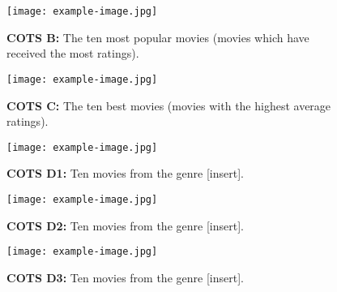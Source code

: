 \begin{figure}[!h]
    \centering
    \texttt{[image: example-image.jpg]}
    \caption{\textbf{COTS B:} The ten most popular movies (movies which have received the most ratings).}
    \label{fig:cots-vis-b}
\end{figure}

\begin{figure}[!h]
    \centering
    \texttt{[image: example-image.jpg]}
    \caption{\textbf{COTS C:} The ten best movies (movies with the highest average ratings).}
    \label{fig:cots-vis-c}
\end{figure}

\begin{figure}[!h]
    \centering
    \texttt{[image: example-image.jpg]}
    \caption{\textbf{COTS D1:} Ten movies from the genre [insert].}
    \label{fig:cots-vis-d1}
\end{figure}

\begin{figure}[!h]
    \centering
    \texttt{[image: example-image.jpg]}
    \caption{\textbf{COTS D2:} Ten movies from the genre [insert].}
    \label{fig:cots-vis-d2}
\end{figure}

\begin{figure}[!h]
    \centering
    \texttt{[image: example-image.jpg]}
    \caption{\textbf{COTS D3:} Ten movies from the genre [insert].}
    \label{fig:cots-vis-d3}
\end{figure}


